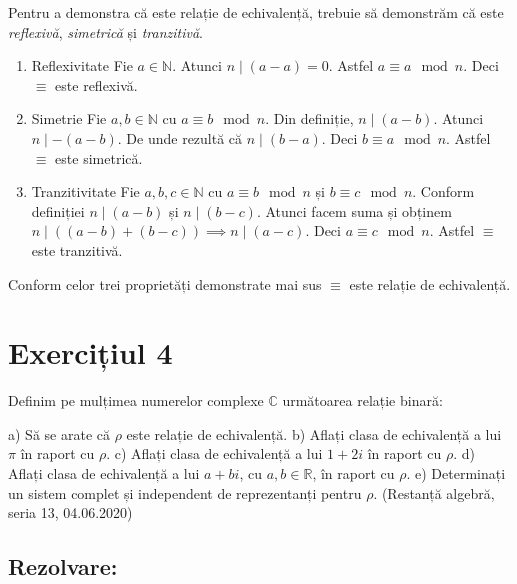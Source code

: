 \documentclass{article}
\DeclareRobustCommand\iff{\;\Longleftrightarrow\;}
\begin{document}
Pentru a demonstra că este relație de echivalență, trebuie să demonstrăm că este \emph{reflexivă}, \emph{simetrică} și \emph{tranzitivă}.

\begin{enumerate}
    \item Reflexivitate
    \newline
    Fie \(a \in\mathbb{N}\). Atunci \(n \mid (a - a) = 0\). Astfel \(a \equiv a \mod n\). Deci \(\equiv\) este reflexivă.
    \item Simetrie
    \newline
    Fie \(a, b \in \mathbb{N}\) cu \(a \equiv b \mod n\). Din definiție, \(n \mid (a - b)\). Atunci \(n \mid - (a - b)\). De unde rezultă că \(n \mid (b - a)\). Deci \(b \equiv a \mod n\). Astfel \(\equiv\) este simetrică.
    \item Tranzitivitate
    \newline
    Fie \(a, b, c \in \mathbb{N}\) cu \(a \equiv b \mod n\) și \(b \equiv c \mod n\). Conform definiției \(n \mid (a - b)\) și \(n \mid (b - c)\). Atunci facem suma și obținem \(n \mid ((a - b) + (b - c)) \implies n \mid (a - c)\). Deci \(a \equiv c \mod n\). Astfel \(\equiv\) este tranzitivă.
\end{enumerate}
Conform celor trei proprietăți demonstrate mai sus \(\equiv\) este relație de echivalență.

\section{Exercițiul 4}
Definim pe mulțimea numerelor complexe  $\mathbb{C}$ următoarea relație binară:
\newline
\center{$x \rho y \iff x - y \in \mathbb{R}$}

\flushleft
a) Să se arate că $\rho$ este relație de echivalență.
\newline
b) Aflați clasa de echivalență a lui $\pi$ în raport cu $\rho$.
\newline
c) Aflați clasa de echivalență a lui $1+2i$ în raport cu $\rho$.
\newline
d) Aflați clasa de echivalență a lui $a+bi$, cu $a, b \in \mathbb{R}$, în raport cu $\rho$.
\newline
e) Determinați un sistem complet și independent de reprezentanți pentru $\rho$.
\small(Restanță algebră, seria 13, 04.06.2020)

\subsection{Rezolvare:}
\end{document}

